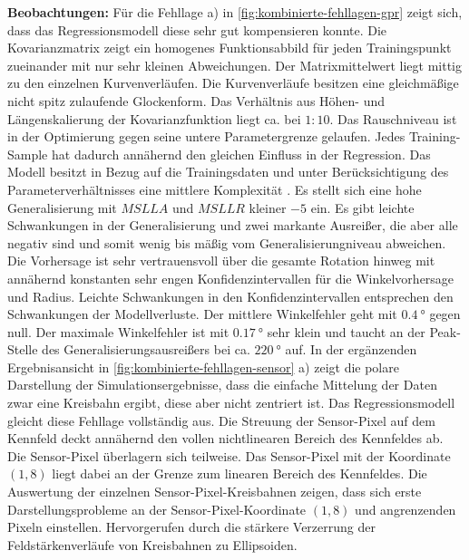 \clearpage


\textbf{Beobachtungen:} Für die Fehllage a) in \autoref{fig:kombinierte-fehllagen-gpr} zeigt sich, dass das Regressionsmodell diese sehr gut kompensieren konnte. Die Kovarianzmatrix zeigt ein homogenes Funktionsabbild für jeden Trainingspunkt zueinander mit nur sehr kleinen Abweichungen. Der Matrixmittelwert liegt mittig zu den einzelnen Kurvenverläufen. Die Kurvenverläufe besitzen eine gleichmäßige nicht spitz zulaufende Glockenform. Das Verhältnis aus Höhen- und Längenskalierung der Kovarianzfunktion liegt ca. bei $1:10$. Das Rauschniveau ist in der Optimierung gegen seine untere Parametergrenze gelaufen. Jedes Training-Sample hat dadurch annähernd den gleichen Einfluss in der Regression. Das Modell besitzt in Bezug auf die Trainingsdaten und unter Berücksichtigung des Parameterverhältnisses eine mittlere Komplexität \cite{Rasmussen2006}. Es stellt sich eine hohe Generalisierung mit $MSLLA$ und $MSLLR$ kleiner $-5$ ein. Es gibt leichte Schwankungen in der Generalisierung und zwei markante Ausreißer, die aber alle negativ sind und somit wenig bis mäßig vom Generalisierungniveau abweichen. Die Vorhersage ist sehr vertrauensvoll über die gesamte Rotation hinweg mit annähernd konstanten sehr engen Konfidenzintervallen für die Winkelvorhersage und Radius. Leichte Schwankungen in den Konfidenzintervallen entsprechen den Schwankungen der Modellverluste. Der mittlere Winkelfehler geht mit $\SI{0,4}{\degree}$ gegen null. Der maximale Winkelfehler ist mit $\SI{0,17}{\degree}$ sehr klein und taucht an der Peak-Stelle des Generalisierungsausreißers bei ca. $\SI{220}{\degree}$ auf. In der ergänzenden Ergebnisansicht in \autoref{fig:kombinierte-fehllagen-sensor} a) zeigt die polare Darstellung der Simulationsergebnisse, dass die einfache Mittelung der Daten zwar eine Kreisbahn ergibt, diese aber nicht zentriert ist. Das Regressionsmodell gleicht diese Fehllage vollständig aus. Die Streuung der Sensor-Pixel auf dem Kennfeld deckt annähernd den vollen nichtlinearen Bereich des Kennfeldes ab. Die Sensor-Pixel überlagern sich teilweise. Das Sensor-Pixel mit der Koordinate $(1,8)$ liegt dabei an der Grenze zum linearen Bereich des Kennfeldes. Die Auswertung der einzelnen Sensor-Pixel-Kreisbahnen zeigen, dass sich erste Darstellungsprobleme an der Sensor-Pixel-Koordinate $(1,8)$ und angrenzenden Pixeln einstellen. Hervorgerufen durch die stärkere Verzerrung der Feldstärkenverläufe von Kreisbahnen zu Ellipsoiden.
\newline
